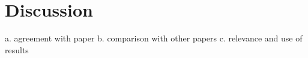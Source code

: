 \documentclass{article}
\begin{document}
	\section{Discussion}
	
a. agreement with paper
b. comparison with other papers
c. relevance and use of results
	
\end{document}
